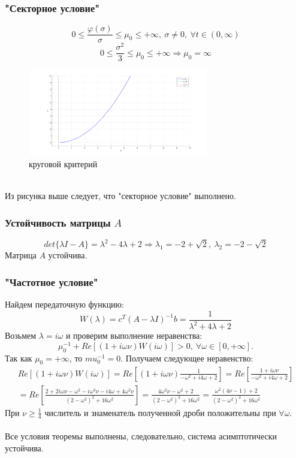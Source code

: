 \documentclass[12pt]{article}
\begin{document}
\subsubsection*{"Секторное условие"}
\[
0 \leq \frac{\varphi(\sigma)}{\sigma} \leq \mu_0 \leq +\infty, \ \sigma \neq 0, \ \forall t \in (0, \infty) 
\]
\[
0 \leq \frac{\sigma^2}{3} \leq \mu_0 \leq +\infty \Rightarrow \mu_0 = \infty
\]
\begin{figure}[h]
    \centering
    \includegraphics[width=0.7\textwidth]{sector_criterion_3}
    \caption{круговой критерий}
    \label{fig:sector_criterion_3}
\end{figure} \\
Из рисунка выше следует, что "секторное условие" выполнено.
\subsubsection*{Устойчивость матрицы $A$}
\[
det\{\lambda I - A\} = \lambda^2 -4\lambda + 2 \Rightarrow \lambda_1 = -2 + \sqrt{2}, \ \lambda_2 = -2 - \sqrt{2}
\]
Матрица $A$ устойчива.
\subsubsection*{"Частотное условие"}
Найдем передаточную функцию:
\[
W(\lambda) = c^T(A - \lambda I)^{-1}b = \frac{1}{\lambda^2 + 4\lambda+2}
\]
Возьмем $\lambda = i \omega$ и проверим выполнение неравенства:
\[
\mu_0^{-1} + Re[(1+i \omega \nu)W(i\omega)] > 0, \ \forall \omega \in [0, +\infty].
\]
Так как $\mu_0 = +\infty$, то $mu_0^{-1} = 0$. Получаем следующее неравенство:
\[
\begin{split}
Re[(1+i \omega \nu)W(i\omega)] = Re[(1+i \omega \nu)\frac{1}{-\omega^2 + i4\omega+2}] = Re[\frac{1+i \omega \nu}{-\omega^2 + i4\omega+2}] \\
= Re[\frac{2+2i \omega \nu - \omega^2 - i\omega^3\nu -i4\omega+4\omega^2\nu}{(2-\omega^2)^2 + 16\omega^2}] = \frac{4\omega^2\nu-\omega^2+2}{(2-\omega^2)^2 + 16\omega^2} = \frac{\omega^2(4\nu-1)+2}{(2-\omega^2)^2 + 16\omega^2}
\end{split}
\]
При $\nu \geq \frac{1}{4}$ числитель и знаменатель полученной дроби положительны при $\forall \omega$. \\
\ \\
Все условия теоремы выполнены, следовательно, система асимптотически устойчива.
\end{document}
